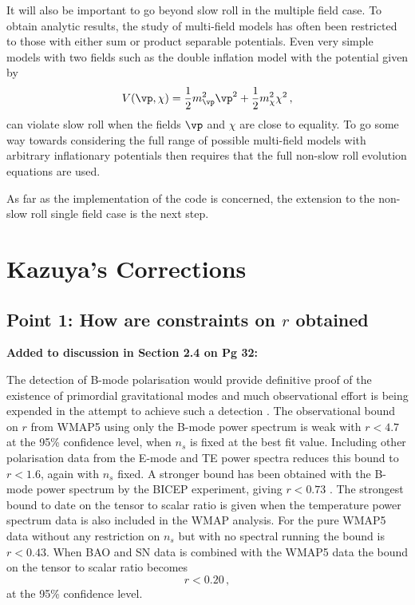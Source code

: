 It will also be important to go beyond slow roll in the multiple field case.
To obtain analytic results, the study of multi-field models has often been restricted to those with
either sum or product separable potentials. Even very simple
models with two fields such as the double inflation model with the potential given by
\cite{Turner:1986te, Silk:1986vc}
% 
\begin{equation}
 V(\vp,\chi) = \frac{1}{2}m_\vp^2\vp^2 + \frac{1}{2}m_\chi^2 \chi^2\,,
\end{equation}
% 
can violate slow roll when the fields $\vp$ and $\chi$ are close to
equality. To go some way towards considering the full range of possible multi-field models with
arbitrary inflationary potentials then requires that the full non-slow roll evolution equations are
used.


As far as the implementation of the code is concerned, the extension to the non-slow roll single
field case is the next step.


\section{Kazuya's Corrections}
\subsection{Point 1: How are constraints on $r$ obtained}
\textbf{Added to discussion in Section 2.4 on Pg 32:}

The detection of B-mode polarisation would provide definitive proof of the existence of primordial
gravitational modes and much observational effort is being expended in the attempt to achieve such
a detection \cite{Seljak:1996gy, Baumann:2008aq,Chiang:2009xs,Piacentini2006,Sievers2007,vpj}.
The observational bound on $r$ from WMAP5 using only the B-mode power spectrum
is weak with $r< 4.7$ at the 95\% confidence level, when $n_s$ is fixed at the best fit value.
Including other polarisation data from the E-mode and TE power spectra reduces this bound to
$r<1.6$, again with $n_s$ fixed. A stronger bound has been obtained with the B-mode
power spectrum by the BICEP experiment, giving $r<0.73$ \cite{Chiang:2009xs}. The
strongest bound to date on the tensor to scalar ratio is given when the temperature power spectrum
data is also included in the WMAP analysis. For the pure WMAP5 data without any restriction on
$n_s$ but with no spectral running the bound is $r<0.43$. When BAO and SN data is combined with the
WMAP5 data the bound on the tensor to scalar ratio becomes
% 
\begin{equation}
\label{eq:rbound-intro}
 r < 0.20\,,
\end{equation}
at the 95\% confidence level. 


